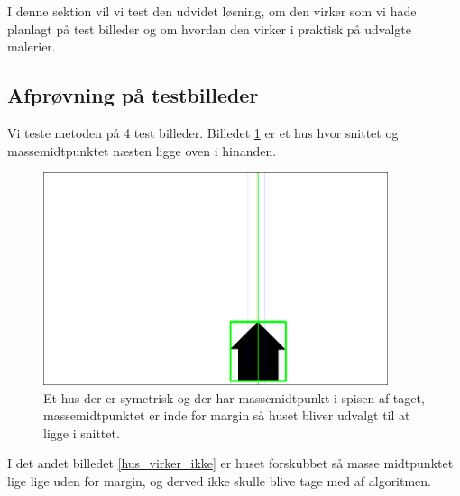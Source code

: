 {\sffamily
I denne sektion vil vi test den udvidet løsning, om den virker som vi
hade planlagt på test billeder og om hvordan den virker i praktisk på
udvalgte malerier.
}
\subsection{Afprøvning på testbilleder}
Vi teste metoden på 4 test billeder. Billedet \ref{hus_virker} er et hus
hvor snittet og massemidtpunktet næsten ligge oven i hinanden. 

\begin{figure}[h!!]
	\begin{center}
		\includegraphics[angle=0,width=0.9\textwidth]{afsnit/afprovning/billeder/udvidet_losning/udvidet_hus1_test.png}
	\end{center}
	\caption[]{Et hus der er symetrisk og der har massemidtpunkt i spisen af taget, massemidtpunktet er inde for margin så huset bliver udvalgt til at ligge i snittet.}
	\label{hus_virker}
\end{figure}

I det andet billedet \ref{hus_virker_ikke} er huset forskubbet så masse
midtpunktet lige lige uden for margin, og derved ikke skulle blive tage
med af algoritmen. 

